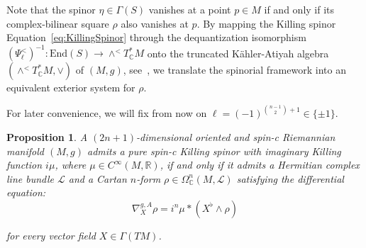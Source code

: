 \documentclass[10pt,a4paper,twoside,reqno]{amsart}
\theoremstyle{plain}
\newtheorem{prop}[thm]{Proposition}
\theoremstyle{definition}
\theoremstyle{remark}
\def\cL{\mathcal{L}}
\begin{document}
Note that the spinor $\eta\in\Gamma(S)$ vanishes at a point $p\in M$ if and only if its complex-bilinear square $\rho$ also vanishes at $p$. By mapping the Killing spinor Equation~\eqref{eq:KillingSpinor} through the dequantization isomorphism $(\Psi_\ell^<)^{-1} \colon \mathrm{End}(S) \to \wedge^< T^*_\mathbb{C} M$ onto the truncated Kähler-Atiyah algebra $(\wedge^< T^*_{\mathbb{C}}M, \vee)$ of $(M,g)$, see~\cite{Algebraic_Complex_Square_2025,Complex_Differential_Spinors_2026}, we translate the spinorial framework into an equivalent exterior system for $\rho$.\medskip

For later convenience, we will fix from now on $\ell=(-1)^{\binom{n-1}{2}+1}\in\{\pm1\}$.

\begin{prop}
\label{prop:KillingSpinorBilinear}
A $(2n+1)$-dimensional oriented and spin-c Riemannian manifold $(M,g)$ admits a pure spin-c Killing spinor with imaginary Killing function $i\mu$, where $\mu \in C^\infty(M, \mathbb{R})$, if and only if it admits a Hermitian complex line bundle $\cL$ and a Cartan $n$-form $\rho \in \Omega^n_{\mathbb{C}}(M, \mathcal{L})$ satisfying the differential equation:
\begin{equation}
\label{eq:imaginary-killing-rho}
\nabla^{g,A}_X \rho = i^n \mu \ast (X^\flat \wedge \rho)
\end{equation}

\noindent
for every vector field $X \in \Gamma(TM)$.
\end{prop}
\end{document}
